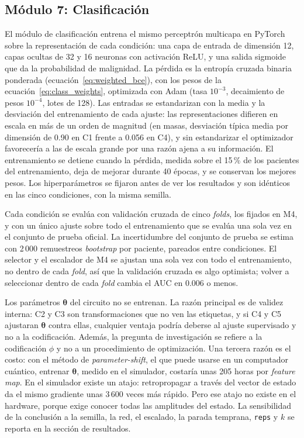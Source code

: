 
\subsection{Módulo 7: Clasificación}

El módulo de clasificación entrena el mismo perceptrón multicapa en PyTorch sobre la
representación de cada condición: una capa de entrada de dimensión 12, capas ocultas de 32 y 16
neuronas con activación ReLU, y una salida sigmoide que da la probabilidad de malignidad. La pérdida
es la entropía cruzada binaria ponderada (ecuación~\eqref{eq:weighted_bce}), con los pesos de la
ecuación~\eqref{eq:class_weights}, optimizada con Adam (tasa $10^{-3}$, decaimiento de pesos
$10^{-4}$, lotes de 128). Las entradas se estandarizan con la media y la desviación del
entrenamiento de cada ajuste: las representaciones difieren en escala en más de un orden de magnitud (en masas, desviación típica media por dimensión de 0.90 en C1 frente a 0.056 en C4), y
sin estandarizar el optimizador favorecería a las de escala grande por una razón ajena a su
información. El entrenamiento se detiene cuando la pérdida, medida sobre el 15\,\% de los pacientes
del entrenamiento, deja de mejorar durante 40 épocas, y se conservan los mejores pesos. Los
hiperparámetros se fijaron antes de ver los resultados y son idénticos en las cinco condiciones, con
la misma semilla.

Cada condición se evalúa con validación cruzada de cinco \textit{folds}, los fijados en M4, y con un
único ajuste sobre todo el entrenamiento que se evalúa una sola vez en el conjunto de prueba oficial.
La incertidumbre del conjunto de prueba se estima con 2\,000 remuestreos \textit{bootstrap} por
paciente, pareados entre condiciones. El selector y el escalador de M4 se ajustan una sola vez con todo
el entrenamiento, no dentro de cada \textit{fold}, así que la validación cruzada es algo optimista;
volver a seleccionar dentro de cada \textit{fold} cambia el AUC en 0.006 o menos.

Los parámetros $\boldsymbol\theta$ del circuito no se entrenan. La razón principal es de validez
interna: C2 y C3 son transformaciones que no ven las etiquetas, y si C4 y C5 ajustaran
$\boldsymbol\theta$ contra ellas, cualquier ventaja podría deberse al ajuste supervisado y no a la
codificación. Además, la pregunta de investigación se refiere a la codificación $\phi$ y no a un
procedimiento de optimización. Una tercera razón es el costo: con el método de
\textit{parameter-shift}, el que puede usarse en un computador cuántico, entrenar $\boldsymbol\theta$, medido en el simulador,
costaría unas 205 horas por \textit{feature map}. En el simulador existe un atajo: retropropagar a
través del vector de estado da el mismo gradiente unas 3\,600 veces más rápido. Pero ese atajo no
existe en el hardware, porque exige conocer todas las amplitudes del estado. La sensibilidad de la
conclusión a la semilla, la red, el escalado, la parada temprana, \texttt{reps} y $k$ se reporta en
la sección de resultados.
